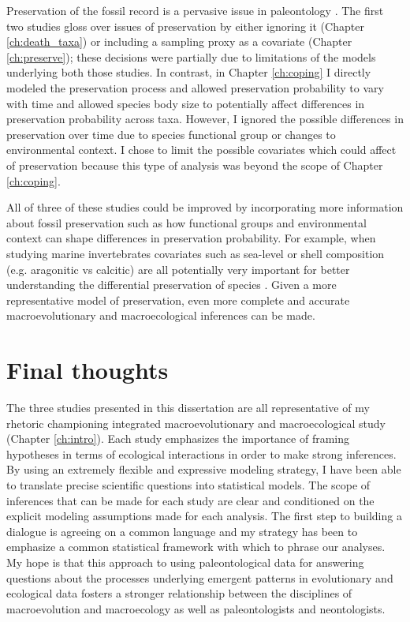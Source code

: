 Preservation of the fossil record is a pervasive issue in paleontology \citep{Foote1996e,Foote1997c,Foote1999a,Foote2001,Lloyd2011,Wang2016b}. The first two studies gloss over issues of preservation by either ignoring it (Chapter \ref{ch:death_taxa}) or including a sampling proxy as a covariate (Chapter \ref{ch:preserve}); these decisions were partially due to limitations of the models underlying both those studies. In contrast, in Chapter \ref{ch:coping} I directly modeled the preservation process and allowed preservation probability to vary with time and allowed species body size to potentially affect differences in preservation probability across taxa. However, I ignored the possible differences in preservation over time due to species functional group or changes to environmental context. I chose to limit the possible covariates which could affect of preservation because this type of analysis was beyond the scope of Chapter \ref{ch:coping}. 

All of three of these studies could be improved by incorporating more information about fossil preservation such as how functional groups and environmental context can shape differences in preservation probability. For example, when studying marine invertebrates covariates such as sea-level or shell composition (e.g. aragonitic vs calcitic) are all potentially very important for better understanding the differential preservation of species \citep{Foote2015b,Peters2002a,Peters2010,Hannisdal2011}. Given a more representative model of preservation, even more complete and accurate macroevolutionary and macroecological inferences can be made.



\section{Final thoughts}

The three studies presented in this dissertation are all representative of my rhetoric championing integrated macroevolutionary and macroecological study (Chapter \ref{ch:intro}). Each study emphasizes the importance of framing hypotheses in terms of ecological interactions in order to make strong inferences. By using an extremely flexible and expressive modeling strategy, I have been able to translate precise scientific questions into statistical models. The scope of inferences that can be made for each study are clear and conditioned on the explicit modeling assumptions made for each analysis. The first step to building a dialogue is agreeing on a common language and my strategy has been to emphasize a common statistical framework with which to phrase our analyses. My hope is that this approach to using paleontological data for answering questions about the processes underlying emergent patterns in evolutionary and ecological data fosters a stronger relationship between the disciplines of macroevolution and macroecology as well as paleontologists and neontologists.

